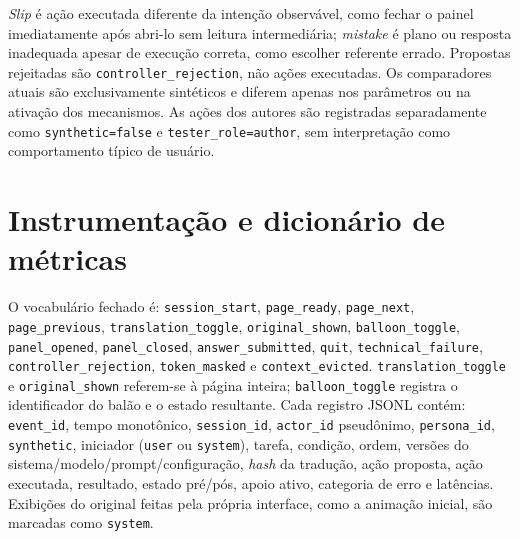 \documentclass[conference]{IEEEtran}
\newcommand{\code}[1]{\texttt{#1}}
\begin{document}
\emph{Slip} é ação executada diferente da intenção observável, como fechar o painel imediatamente após abri-lo sem leitura intermediária; \emph{mistake} é plano ou resposta inadequada apesar de execução correta, como escolher referente errado. Propostas rejeitadas são \code{controller\_rejection}, não ações executadas. Os comparadores atuais são exclusivamente sintéticos e diferem apenas nos parâmetros ou na ativação dos mecanismos. As ações dos autores são registradas separadamente como \code{synthetic=false} e \code{tester\_role=author}, sem interpretação como comportamento típico de usuário.

\section{Instrumentação e dicionário de métricas}
O vocabulário fechado é: \code{session\_start}, \code{page\_ready}, \code{page\_next}, \code{page\_previous}, \code{translation\_toggle}, \code{original\_shown}, \code{balloon\_toggle}, \code{panel\_opened}, \code{panel\_closed}, \code{answer\_submitted}, \code{quit}, \code{technical\_failure}, \code{controller\_rejection}, \code{token\_masked} e \code{context\_evicted}. \code{translation\_toggle} e \code{original\_shown} referem-se à página inteira; \code{balloon\_toggle} registra o identificador do balão e o estado resultante. Cada registro JSONL contém: \code{event\_id}, tempo monotônico, \code{session\_id}, \code{actor\_id} pseudônimo, \code{persona\_id}, \code{synthetic}, iniciador (\code{user} ou \code{system}), tarefa, condição, ordem, versões do sistema/modelo/prompt/configuração, \emph{hash} da tradução, ação proposta, ação executada, resultado, estado pré/pós, apoio ativo, categoria de erro e latências. Exibições do original feitas pela própria interface, como a animação inicial, são marcadas como \code{system}.
\end{document}
